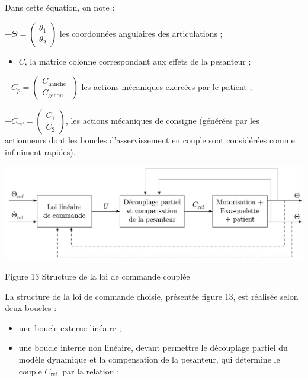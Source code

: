\documentclass[10pt]{article}
\begin{document}
Dans cette équation, on note :

$-\Theta=\left(\begin{array}{c}\theta_{1} \\ \theta_{2}\end{array}\right)$ les coordonnées angulaires des articulations ;

\begin{itemize}
  \item $C$, la matrice colonne correspondant aux effets de la pesanteur ;
\end{itemize}

$-C_{p}=\left(\begin{array}{c}C_{\text {hanche }} \\ C_{\text {genou }}\end{array}\right)$ les actions mécaniques exercées par le patient ;

$-C_{\mathrm{ref}}=\left(\begin{array}{l}C_{1} \\ C_{2}\end{array}\right)$, les actions mécaniques de consigne (générées par les actionneurs dont les boucles d'asservissement en couple sont considérées comme infiniment rapides).

\begin{center}
\includegraphics[max width=\textwidth]{2023_05_12_54c6a64d2ffce28d5c72g-10}
\end{center}

Figure 13 Structure de la loi de commande couplée

La structure de la loi de commande choisie, présentée figure 13, est réalisée selon deux boucles :

\begin{itemize}
  \item une boucle externe linéaire ;

  \item une boucle interne non linéaire, devant permettre le découplage partiel du modèle dynamique et la compensation de la pesanteur, qui détermine le couple $C_{\text {ref }}$ par la relation :

\end{itemize}
\end{document}

